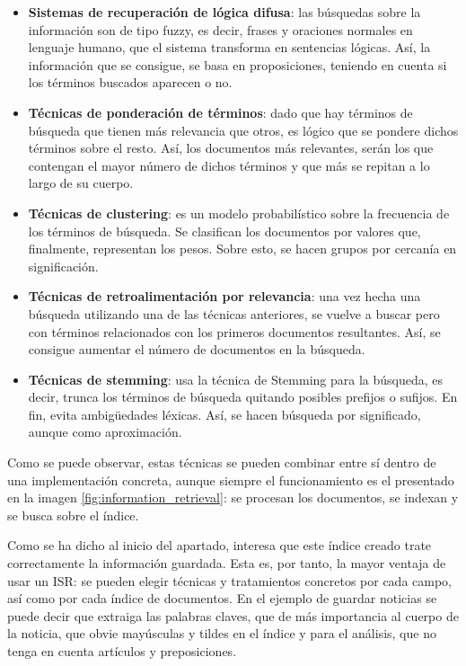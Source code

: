 \begin{itemize}
    \item \textbf{Sistemas de recuperación de lógica difusa}: las búsquedas sobre la información son de tipo fuzzy, es decir, frases y oraciones normales en lenguaje humano, que el sistema transforma en sentencias lógicas. Así, la información que se consigue, se basa en proposiciones, teniendo en cuenta si los términos buscados aparecen o no.
    \item \textbf{Técnicas de ponderación de términos}: dado que hay términos de búsqueda que tienen más relevancia que otros, es lógico que se pondere dichos términos sobre el resto. Así, los documentos más relevantes, serán los que contengan el mayor número de dichos términos y que más se repitan a lo largo de su cuerpo.
    \item \textbf{Técnicas de clustering}: es un modelo probabilístico sobre la frecuencia de los términos de búsqueda. Se clasifican los documentos por valores que, finalmente, representan los pesos. Sobre esto, se hacen grupos por cercanía en significación.
    \item \textbf{Técnicas de retroalimentación por relevancia}: una vez hecha una búsqueda utilizando una de las técnicas anteriores, se vuelve a buscar pero con términos relacionados con los primeros documentos resultantes. Así, se consigue aumentar el número de documentos en la búsqueda.
    \item \textbf{Técnicas de stemming}: usa la técnica de Stemming para la búsqueda, es decir, trunca los términos de búsqueda quitando posibles prefijos o sufijos. En fin, evita ambigüedades léxicas. Así, se hacen búsqueda por significado, aunque como aproximación.
\end{itemize}

Como se puede observar, estas técnicas se pueden combinar entre sí dentro de una implementación concreta, aunque siempre el funcionamiento es el presentado en la imagen \ref{fig:information_retrieval}: se procesan los documentos, se indexan y se busca sobre el índice.

Como se ha dicho al inicio del apartado, interesa que este índice creado trate correctamente la información guardada. Esta es, por tanto, la mayor ventaja de usar un ISR: se pueden elegir técnicas y tratamientos concretos por cada campo, así como por cada índice de documentos. En el ejemplo de guardar noticias se puede decir que extraiga las palabras claves, que de más importancia al cuerpo de la noticia, que obvie mayúsculas y tildes en el índice y para el análisis, que no tenga en cuenta artículos y preposiciones.


